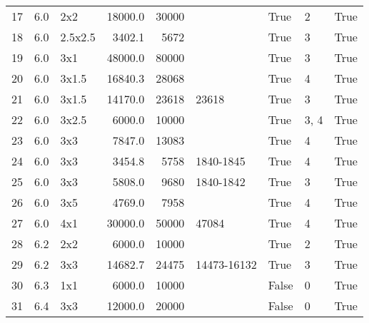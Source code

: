 \begin{center}
\begin{tabular}{l | c | l | r r l | l l | l }
        17  & 6.0    & 2x2      & 18000.0 & 30000       & ~            & True     & 2      & True   \\ 
        18  & 6.0    & 2.5x2.5  &  3402.1 &  5672       & ~            & True     & 3      & True   \\
        19  & 6.0    & 3x1      & 48000.0 & 80000       & ~            & True     & 3      & True   \\ 
        20  & 6.0    & 3x1.5    & 16840.3 & 28068       & ~            & True     & 4      & True   \\ 
        21  & 6.0    & 3x1.5    & 14170.0 & 23618       & 23618        & True     & 3      & True   \\ 
        22  & 6.0    & 3x2.5    &  6000.0 & 10000       & ~            & True     & 3, 4   & True   \\ 
        23  & 6.0    & 3x3      &  7847.0 & 13083       & ~            & True     & 4      & True   \\ 
        24  & 6.0    & 3x3      &  3454.8 &  5758       & 1840-1845    & True     & 4      & True   \\ 
        25  & 6.0    & 3x3      &  5808.0 &  9680       & 1840-1842    & True     & 3      & True   \\ 
        26  & 6.0    & 3x5      &  4769.0 &  7958       & ~            & True     & 4      & True   \\ 
        27  & 6.0    & 4x1      & 30000.0 & 50000       & 47084        & True     & 4      & True   \\ 
        28  & 6.2    & 2x2      &  6000.0 & 10000       & ~            & True     & 2      & True   \\ 
        29  & 6.2    & 3x3      & 14682.7 & 24475       & 14473-16132  & True     & 3      & True   \\ 
        30  & 6.3    & 1x1      &  6000.0 & 10000       & ~            & False    & 0      & True   \\ 
        31  & 6.4    & 3x3      & 12000.0 & 20000       & ~            & False    & 0      & True   \\ 
    \end{tabular}
    \label{tab:parametersTime}
\end{center}

